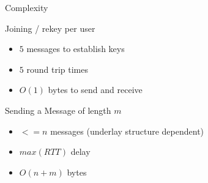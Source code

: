 \begin{frame}{Complexity}
	\begin{block}{Joining / rekey per user}
		\begin{itemize}
			\item[] $5$ messages to establish keys
			\item[] $5$ round trip times
			\item[] $O(1)$ bytes to send and receive
		\end{itemize}
	\end{block}
	\begin{block}{Sending a Message of length $m$}
		\begin{itemize}
			\item[] $<=n$ messages (underlay structure dependent)
			\item[] $max(RTT)$ delay
			\item[] $O(n+m)$ bytes
		\end{itemize}
	\end{block}
\end{frame}
